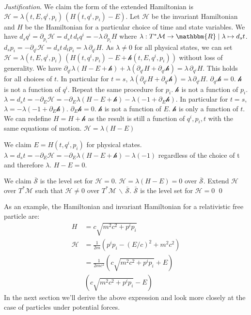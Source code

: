 \documentclass[aps,pra,10pt,twocolumn,floatfix,nofootinbib]{revtex4-1}
\numberwithin{equation}{section}
\theoremstyle{definition}
\newenvironment{justification}{\emph{Justification}.}{\qed}
\begin{document}
\begin{justification}
	We claim the form of the extended Hamiltonian is $\mathcal{H} = \lambda(t,E,q^i,p_i) \, (H(t,q^i,p_i) - E)$. Let $\mathcal{H}$ be the invariant Hamiltonian and $H$ be the Hamiltonian for a particular choice of time and state variables. We have $d_s q^i = \partial_{p_i} \mathcal{H} = d_s t \, d_t q^i = - \lambda \, \partial_{p_i} H$ where $\lambda : T^*\mathcal{M} \rightarrow \mathbbm{R} \; | \; \lambda \mapsto d_s t$. $d_s p_i = - \partial_{q^i} \mathcal{H} = d_s t \, d_t p_i = \lambda \, \partial_{q^i} H$. As $\lambda \neq 0$ for all physical states, we can set $\mathcal{H} = \lambda(t,E,q^i,p_i) \, (H(t,q^i,p_i) - E + \mathcal{h}(t,E,q^i,p_i))$ without loss of generality. We have $\partial_{q^i} \lambda (H - E + \mathcal{h}) + \lambda (\partial_{q^i} H + \partial_{q^i} \mathcal{h}) = \lambda \, \partial_{q^i} H$. This holds for all choices of $t$. In particular for $t=s$, $\lambda (\partial_{q^i} H + \partial_{q^i} \mathcal{h}) = \lambda \, \partial_{q^i} H$. $\partial_{q^i} \mathcal{h} = 0$. $\mathcal{h}$ is not a function of $q^i$. Repeat the same procedure for $p_i$. $\mathcal{h}$ is not a function of $p_i$. $\lambda = d_s t = - \partial_E \mathcal{H} = - \partial_{E} \lambda (H - E + \mathcal{h}) - \lambda (-1 + \partial_{E} \mathcal{h})$. In particular for $t=s$, $\lambda = - \lambda (-1 + \partial_{E} \mathcal{h})$. $\partial_{E} \mathcal{h} = 0$. $\mathcal{h}$ is not a function of $E$. $\mathcal{h}$ is only a function of $t$. We can redefine $H = H + \mathcal{h}$ as the result is still a function of $q^i, p_i , t$ with the same equations of motion. $\mathcal{H}=\lambda (H - E)$
	
	We claim $E = H(t,q^i,p_i)$ for physical states. $\lambda = d_s t = - \partial_E \mathcal{H} = - \partial_{E} \lambda (H - E + \mathcal{h}) - \lambda (-1)$ regardless of the choice of t and therefore $\lambda$. $H - E = 0$. 
	
	We claim $\bar{\mathcal{S}}$ is the level set for $\mathcal{H} = 0$. $\mathcal{H} = \lambda (H - E) = 0$ over $\bar{\mathcal{S}}$. Extend $\mathcal{H}$ over $T^* \mathcal{M}$ such that $\mathcal{H} \neq 0$ over $T^*\mathcal{M} \,\backslash\, \bar{\mathcal{S}}$. $\bar{\mathcal{S}}$ is the level set for $\mathcal{H} = 0$
\end{justification}

As an example, the Hamiltonian and invariant Hamiltonian for a relativistic free particle are:
\begin{equation}\label{free_hamiltonians}
\begin{aligned}
H &= c \sqrt{m^2 c^2 + p^i p_i} \\
\mathcal{H} &= \frac{1}{2m} ( p^i p_i - (E/c)^2 + m^2c^2) \\
 &= \frac{1}{2mc^2} (c \sqrt{m^2 c^2 + p^i p_i} + E) \\
 &(c \sqrt{m^2 c^2 + p^i p_i} - E)
\end{aligned}
\end{equation}
In the next section we'll derive the above expression and look more closely at the case of particles under potential forces.
\end{document}
